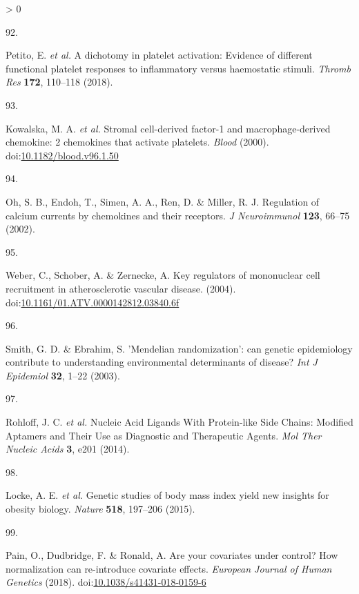 \documentclass[11pt,twoside]{bristolthesis}
\newlength{\cslhangindent}
\newlength{\csllabelwidth}
\newenvironment{CSLReferences}[2] %
 {%
  \setlength{\parindent}{0pt}
  \ifodd #1 \everypar{\setlength{\hangindent}{\cslhangindent}}\ignorespaces\fi
  \ifnum #2 > 0
  \setlength{\parskip}{#2\baselineskip}
  \fi
 }%
 {}
\newcommand{\CSLLeftMargin}[1]{\parbox[t]{\csllabelwidth}{#1}}
\newcommand{\CSLRightInline}[1]{\parbox[t]{\linewidth - \csllabelwidth}{#1}\break}
\begin{document}
\begin{CSLReferences}{0}{0}
\leavevmode\hypertarget{ref-Petito2018}{}%
\CSLLeftMargin{92. }
\CSLRightInline{Petito, E. \emph{et al.} {A dichotomy in platelet activation: Evidence of different functional platelet responses to inflammatory versus haemostatic stimuli}. \emph{Thromb Res} \textbf{172}, 110--118 (2018).}

\leavevmode\hypertarget{ref-Kowalska2000}{}%
\CSLLeftMargin{93. }
\CSLRightInline{Kowalska, M. A. \emph{et al.} {Stromal cell-derived factor-1 and macrophage-derived chemokine: 2 chemokines that activate platelets}. \emph{Blood} (2000). doi:\href{https://doi.org/10.1182/blood.v96.1.50}{10.1182/blood.v96.1.50}}

\leavevmode\hypertarget{ref-Oh2002}{}%
\CSLLeftMargin{94. }
\CSLRightInline{Oh, S. B., Endoh, T., Simen, A. A., Ren, D. \& Miller, R. J. {Regulation of calcium currents by chemokines and their receptors}. \emph{J Neuroimmunol} \textbf{123}, 66--75 (2002).}

\leavevmode\hypertarget{ref-Weber2004}{}%
\CSLLeftMargin{95. }
\CSLRightInline{Weber, C., Schober, A. \& Zernecke, A. {Key regulators of mononuclear cell recruitment in atherosclerotic vascular disease}. (2004). doi:\href{https://doi.org/10.1161/01.ATV.0000142812.03840.6f}{10.1161/01.ATV.0000142812.03840.6f}}

\leavevmode\hypertarget{ref-Smith2003}{}%
\CSLLeftMargin{96. }
\CSLRightInline{Smith, G. D. \& Ebrahim, S. {'Mendelian randomization': can genetic epidemiology contribute to understanding environmental determinants of disease?} \emph{Int J Epidemiol} \textbf{32}, 1--22 (2003).}

\leavevmode\hypertarget{ref-Rohloff2014}{}%
\CSLLeftMargin{97. }
\CSLRightInline{Rohloff, J. C. \emph{et al.} {Nucleic Acid Ligands With Protein-like Side Chains: Modified Aptamers and Their Use as Diagnostic and Therapeutic Agents}. \emph{Mol Ther Nucleic Acids} \textbf{3}, e201 (2014).}

\leavevmode\hypertarget{ref-Locke2015}{}%
\CSLLeftMargin{98. }
\CSLRightInline{Locke, A. E. \emph{et al.} {Genetic studies of body mass index yield new insights for obesity biology}. \emph{Nature} \textbf{518}, 197--206 (2015).}

\leavevmode\hypertarget{ref-Pain2018}{}%
\CSLLeftMargin{99. }
\CSLRightInline{Pain, O., Dudbridge, F. \& Ronald, A. {Are your covariates under control? How normalization can re-introduce covariate effects}. \emph{European Journal of Human Genetics} (2018). doi:\href{https://doi.org/10.1038/s41431-018-0159-6}{10.1038/s41431-018-0159-6}}


\end{CSLReferences}
\end{document}
